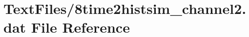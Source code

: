 \hypertarget{8time2histsim__channel2_8dat}{}\section{Text\+Files/8time2histsim\+\_\+channel2.dat File Reference}
\label{8time2histsim__channel2_8dat}
